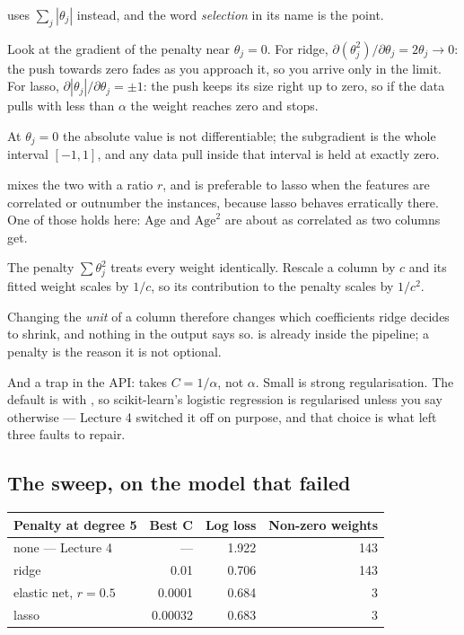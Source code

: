 \documentclass[11pt,a4paper]{article}
\begin{document}
 uses $\sum_j|\theta_j|$ instead, and the word \emph{selection} in
its name is the point.

\begin{derivbox}[title={Why $\ell_1$ produces exact zeros and $\ell_2$ does not}]
Look at the gradient of the penalty near $\theta_j = 0$. For ridge,
$\partial(\theta_j^2)/\partial\theta_j = 2\theta_j \to 0$: the push towards zero
fades as you approach it, so you arrive only in the limit. For lasso,
$\partial|\theta_j|/\partial\theta_j = \pm 1$: the push keeps its size right up
to zero, so if the data pulls with less than $\alpha$ the weight reaches zero
and stops.

At $\theta_j = 0$ the absolute value is not differentiable; the subgradient is
the whole interval $[-1,1]$, and any data pull inside that interval is held at
exactly zero.
\end{derivbox}

 mixes the two with a ratio $r$, and is preferable to lasso
when the features are correlated or outnumber the instances, because lasso
behaves erratically there. One of those holds here: $\text{Age}$ and
$\text{Age}^2$ are about as correlated as two columns get.

\begin{failbox}[title={Failure condition --- an unscaled penalty}]
The penalty $\sum\theta_j^2$ treats every weight identically. Rescale a column
by $c$ and its fitted weight scales by $1/c$, so its contribution to the
penalty scales by $1/c^2$.

Changing the \emph{unit} of a column therefore changes which coefficients ridge
decides to shrink, and nothing in the output says so.  is
already inside the pipeline; a penalty is the reason it is not optional.
\end{failbox}

And a trap in the API:  takes $C = 1/\alpha$, not
$\alpha$. Small  is strong regularisation. The default is
 with , so scikit-learn's logistic regression is
regularised unless you say otherwise --- Lecture 4 switched it off on purpose,
and that choice is what left three faults to repair.

\subsection{The sweep, on the model that failed}

\begin{center}
\small
\begin{tabular}{lrrr}
\toprule
\textbf{Penalty at degree 5} & \textbf{Best C} & \textbf{Log loss} &
\textbf{Non-zero weights} \\
\midrule
none --- Lecture 4 & --- & 1.922 & 143 \\
ridge & 0.01 & 0.706 & 143 \\
elastic net, $r = 0.5$ & 0.0001 & 0.684 & 3 \\
lasso & 0.00032 & 0.683 & 3 \\
\bottomrule
\end{tabular}
\end{center}
\end{document}
